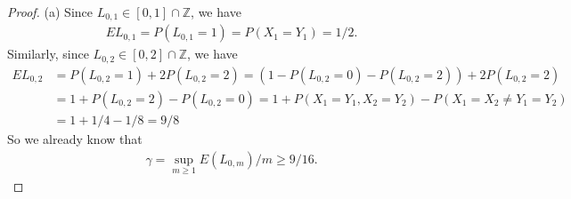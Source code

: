 \documentclass[12pt,a4paper]{amsart}
\theoremstyle{plain}
\theoremstyle{definition}
\theoremstyle{remark}
\numberwithin{equation}{section}
\begin{document}
\begin{proof}
(a) Since $L_{0,1} \in [0,1] \cap \mathbb Z$, we have
\begin{align}
E L_{0,1} 
= P(L_{0,1} = 1) 
= P(X_1 = Y_1)
= 1/2.
\end{align}
Similarly, since $L_{0,2} \in [0,2]\cap \mathbb Z$, we have
\begin{align}
E L_{0,2}
& = P(L_{0,2} = 1) + 2P(L_{0,2} = 2)
= \left( 1- P(L_{0,2} = 0) - P(L_{0,2} = 2) \right) + 2 P(L_{0,2} = 2)
\\&= 1 + P(L_{0,2} = 2) - P(L_{0,2} = 0)
= 1+ P(X_1=Y_1, X_2= Y_2) - P(X_1 = X_2 \neq Y_1 = Y_2)
\\& = 1 + 1/4 - 1/8 
= 9/8
\end{align} 
So we already know that 
\begin{align}
\gamma = \sup_{m\geq 1} E(L_{0,m})/m \geq 9/16.
\end{align}


\end{proof}
\end{document}
